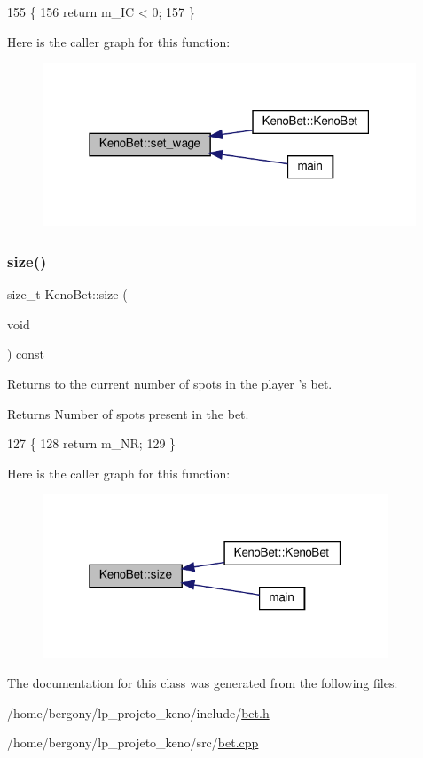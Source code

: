\begin{DoxyCode}
155 \{
156     \textcolor{keywordflow}{return} m\_IC < 0;
157 \}
\end{DoxyCode}
Here is the caller graph for this function\+:
\nopagebreak
\begin{figure}[H]
\begin{center}
\leavevmode
\includegraphics[width=316pt]{classKenoBet_a2b21e387cde33818230d9895845b2d9a_icgraph}
\end{center}
\end{figure}
\mbox{\label{classKenoBet_aa6f65b35514270c2707e60b9dea23ae9}} 
\subsubsection{\texorpdfstring{size()}{size()}}
{\footnotesize\ttfamily size\+\_\+t Keno\+Bet\+::size (\begin{DoxyParamCaption}\item[{void}]{ }\end{DoxyParamCaption}) const}



Returns to the current number of spots in the player ’s bet. 

\begin{DoxyReturn}{Returns}
Number of spots present in the bet. 
\end{DoxyReturn}

\begin{DoxyCode}
127 \{
128     \textcolor{keywordflow}{return} m\_NR;
129 \}
\end{DoxyCode}
Here is the caller graph for this function\+:
\nopagebreak
\begin{figure}[H]
\begin{center}
\leavevmode
\includegraphics[width=292pt]{classKenoBet_aa6f65b35514270c2707e60b9dea23ae9_icgraph}
\end{center}
\end{figure}


The documentation for this class was generated from the following files\+:\begin{DoxyCompactItemize}
\item 
/home/bergony/lp\+\_\+projeto\+\_\+keno/include/\hyperlink{bet_8h}{bet.\+h}\item 
/home/bergony/lp\+\_\+projeto\+\_\+keno/src/\hyperlink{bet_8cpp}{bet.\+cpp}\end{DoxyCompactItemize}
